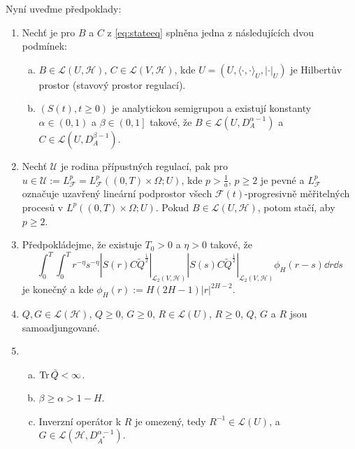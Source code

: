     Nyní uveďme předpoklady:
    \begin{enumerate}[({A}1)]
        \item Nechť je pro $B$ a $C$ z \eqref{eq:stateeq} splněna jedna z
            následujících dvou podmínek:
            \begin{enumerate}[(a)]
                \item $B\in\mathscr{L}\left( U,\mathscr{H} \right)$,
                    $C\in\mathscr{L}\left( V,\mathscr{H} \right)$, kde
                    $U = \left( U,\langle \cdot,\cdot \rangle_U,|\cdot|_U
                    \right)$ je Hilbertův prostor (stavový prostor
                    regulací).
                \item $\left(S(t),t\geq0\right)$ je analytickou semigrupou a
                    existují konstanty $\alpha\in\left( 0,1 \right)$ a
                $\beta\in\left( 0,1 \right]$ takové, že
                $B\in\mathscr{L}\left(U, D_A^{\alpha-1} \right)$ a
                $C\in\mathscr{L}\left(U, D_A^{\beta-1} \right)$.
            \end{enumerate}
        \item Nechť $\mathscr{U}$ je rodina přípustných regulací, pak pro
            $u\in\mathscr{U} := L_\mathscr{F}^p=L_\mathscr{F}^p\left( \left(
            0,T \right)\times \Omega;U \right)$, kde $p > \frac{1}{a}$,
            $p\geq2$ je pevné a $L_\mathscr{F}^p$ označuje uzavřený lineární
            podprostor všech $\mathscr{F}(t)$-progresivně měřitelných procesů v
            $L^p \left( \left( 0,T \right)\times \Omega;U \right)$. Pokud
            $B\in\mathscr{L}\left( U,\mathscr{H} \right)$, potom stačí, aby
            $p\geq2$.
        \item Předpokládejme, že existuje $T_0>0$ a $\eta>0$ takové, že
            $$ \int_0^T \int_0^T r^{-\eta}s^{-\eta}
            |S(r)C\tilde{Q}^{\frac{1}{2}}|_{\mathscr{L}_2\left(
            V,\mathscr{H} \right)}|S(s)C\tilde{Q}^{\frac{1}{2}}|_{\mathscr{L}_2\left(
            V,\mathscr{H} \right)} \phi_H(r-s)\dd r\!\dd s$$
            je konečný a kde $\phi_H(r):=H\left( 2H-1 \right)|r|^{2H-2}$.
        \item $Q,G\in\mathscr{L}(\mathscr{H})$, $Q\geq0$, $G\geq0$,
            $R\in\mathscr{L}(U)$, $R\geq0$, $Q$, $G$ a $R$ jsou
            samoadjungované.
        \item 
            \begin{enumerate}[(a)]
                \item $\operatorname{Tr}\tilde{Q}<\infty$.
                \item $\beta\geq\alpha>1-H$.
                \item Inverzní operátor k $R$ je omezený, tedy
                    $R^{-1}\in\mathscr{L}(U)$, a
                    $G\in\mathscr{L}(\mathscr{H},D_{A^*}^{\alpha-1})$.
            \end{enumerate}
    \end{enumerate}
    
